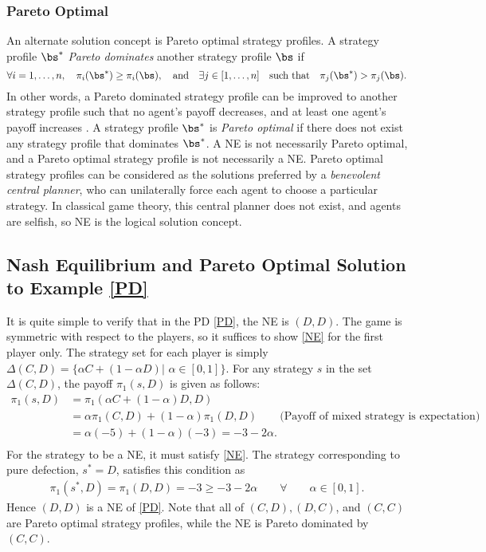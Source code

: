 \subsubsection{Pareto Optimal}
An alternate solution concept is Pareto optimal strategy profiles. A strategy profile $\bs^*$ \emph{Pareto dominates} another strategy profile $\bs$ if $$\forall i=1,\dots,n, \quad \pi_i(\bs^*)\geq \pi_i(\bs), \quad  \text{and} \quad  \exists  j\in [1,\dots,n] \quad \text{such that} \quad \pi_j(\bs^*)>\pi_j(\bs).$$ In other words, a Pareto dominated strategy profile can be improved to another strategy profile such that no agent's payoff decreases, and at least one agent's payoff increases \cite{RN97}. A strategy profile $\bs^*$ is \emph{Pareto optimal} if there does not exist any strategy profile that dominates $\bs^*$. A NE is not necessarily Pareto optimal, and a Pareto optimal strategy profile is not necessarily a NE. Pareto optimal strategy profiles can be considered as the solutions preferred by a \emph{benevolent central planner}, who can unilaterally force each agent to choose a particular strategy. In classical game theory, this central planner does not exist, and agents are selfish, so NE is the logical solution concept. \\


\subsection{Nash Equilibrium and Pareto Optimal Solution to Example \ref{PD}}


It is quite simple to verify that in the PD \eqref{PD}, the NE is $(D, D)$. The game is symmetric with respect to the players, so it suffices to show \eqref{NE} for the first player only. The strategy set for each player is simply $\Delta(C,D) = \{\alpha C + (1-\alpha D)|$   $\alpha \in [0,1] \}$.  For any strategy $s$ in the set $\Delta(C,D)$, the payoff $\pi_1(s,D)$ is given as follows: \\
\begin{align*}
\pi_1(s,D) &= \pi_1(\alpha C + (1-\alpha)D,D) \\
&=\alpha \pi_1(C,D) + (1-\alpha) \pi_1(D,D) \qquad \text{(Payoff of mixed strategy is expectation)} \\
&= \alpha (-5) + (1-\alpha)(-3) = -3 -2\alpha. \\
\end{align*}
For the strategy to be a NE, it must satisfy \eqref{NE}. The strategy corresponding to pure defection, $s^* = D$, satisfies this condition as \\
\begin{align*}
    \pi_1(s^*,D) =\pi_1(D,D) = -3 \geq -3-2\alpha \qquad \forall \qquad \alpha \in [0,1].
\end{align*}
Hence $(D,D)$ is a NE of \eqref{PD}. Note that all of $(C,D), (D,C)$, and $(C,C)$ are  Pareto optimal strategy profiles, while the NE is Pareto dominated by $(C,C)$.  \\


